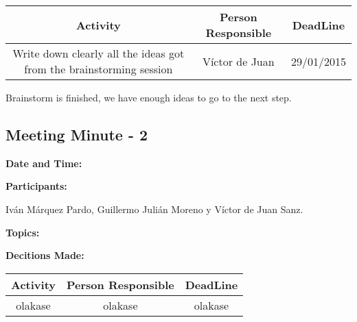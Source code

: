 \begin{tabular}{|c|c|c|}
\hline Activity & Person Responsible & DeadLine \\\hline
Write down clearly all the ideas got from the brainstorming session & Víctor de Juan & 29/01/2015\\\hline

\end{tabular}

Brainstorm is finished, we have enough ideas to go to the next step.

\subsection{Meeting Minute - 2}


\textbf{Date and Time:}


\textbf{Participants: }

Iván Márquez Pardo, Guillermo Julián Moreno y Víctor de Juan Sanz.


\textbf{Topics: }

\textbf{Decitions Made: \\}

\begin{tabular}{|c|c|c|}
\hline Activity & Person Responsible & DeadLine \\\hline
olakase & olakase & olakase \\\hline

\end{tabular}